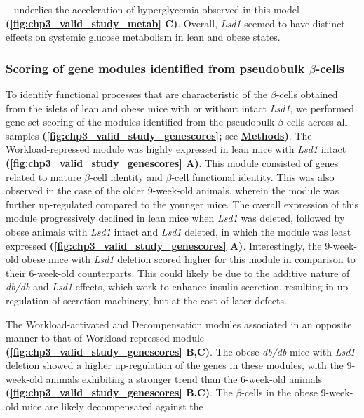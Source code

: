 -- underlies the acceleration of hyperglycemia observed in this model \textbf{(\autoref{fig:chp3_valid_study_metab} C)}. Overall, \textit{Lsd1} seemed to have distinct effects on systemic glucose metabolism in lean and obese states.





\subsubsection{\large Scoring of gene modules identified from pseudobulk $\beta$-cells}

\par To identify functional processes that are characteristic of the $\beta$-cells obtained from the islets of lean and obese mice with or without intact \textit{Lsd1}, we performed gene set scoring of the modules identified from the pseudobulk $\beta$-cells across all samples \textbf{(\autoref{fig:chp3_valid_study_genescores};} see \textbf{\hyperref[subsubsec:met_chp3_scoring]{Methods})}. The Workload-repressed module was highly expressed in lean mice with \textit{Lsd1} intact \textbf{(\autoref{fig:chp3_valid_study_genescores} A)}. This module consisted of genes related to mature $\beta$-cell identity and $\beta$-cell functional identity. This was also observed in the case of the older 9-week-old animals, wherein the module was further up-regulated compared to the younger mice. The overall expression of this module progressively declined in lean mice when \textit{Lsd1} was deleted, followed by obese animals with \textit{Lsd1} intact and \textit{Lsd1} deleted, in which the module was least expressed \textbf{(\autoref{fig:chp3_valid_study_genescores} A)}. Interestingly, the 9-week-old obese mice with \textit{Lsd1} deletion scored higher for this module in comparison to their 6-week-old counterparts. This could likely be due to the additive nature of \textit{db/db} and \textit{Lsd1} effects, which work to enhance insulin secretion, resulting in up-regulation of secretion machinery, but at the cost of later defects.\\


\par The Workload-activated and Decompensation modules associated in an opposite manner to that of Workload-repressed module \textbf{(\autoref{fig:chp3_valid_study_genescores} B,C)}. The obese \textit{db/db} mice with \textit{Lsd1} deletion showed a higher up-regulation of the genes in these modules, with the 9-week-old animals exhibiting a stronger trend than the 6-week-old animals \textbf{(\autoref{fig:chp3_valid_study_genescores} B,C)}. The $\beta$-cells in the obese 9-week-old mice are likely decompensated against the 

